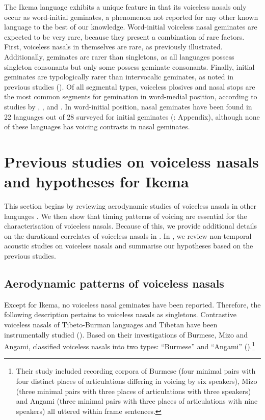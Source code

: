 \documentclass[output=paper]{langscibook}
\begin{document}
\begin{sloppypar}
The Ikema language exhibits a unique feature in that its voiceless nasals only occur as word-initial geminates, a phenomenon not reported for any other known language to the best of our knowledge. Word-initial voiceless nasal geminates are expected to be very rare, because they present a combination of rare factors. First, voiceless nasals in themselves are rare, as previously illustrated. Additionally, geminates are rarer than singletons, as all languages possess singleton consonants but only some possess geminate consonants. Finally, initial geminates are typologically rarer than intervocalic geminates, as noted in previous studies (\citealt{Thurgood1993,Dmitrieva2012}). Of all segmental types, voiceless plosives and nasal stops are the most common segments for gemination in word-medial position, according to studies by \citet{Jaeger1978}, \citet{Kirchner2001}, \citet{Podesva2002} and \citet{Maddieson2008}. In word-initial position, nasal geminates have been found in 22 languages out of 28 surveyed for initial geminates (\citealt{Muller2001}: Appendix), although none of these languages has voicing contrasts in nasal geminates.
\end{sloppypar}

\section{Previous studies on voiceless nasals and hypotheses for Ikema}
\label{sec:shinohara:2}
This section begins by reviewing aerodynamic studies of voiceless nasals in other languages . We then show that timing patterns of voicing are essential for the characterisation of voiceless nasals. Because of this, we provide additional details on the durational correlates of voiceless nasals in . In , we review non-temporal acoustic studies on voiceless nasals and summarise our hypotheses based on the previous studies.

\subsection{Aerodynamic patterns of voiceless nasals}\label{sec:shinohara:2.1}
Except for Ikema, no voiceless nasal geminates have been reported. Therefore, the following description pertains to voiceless nasals as singletons. Contrastive voiceless nasals of Tibeto-Burman languages and Tibetan have been instrumentally studied (\citealt{Dantsuji1984,Dantsuji1986,BhaskararaoLadefoged1991}). Based on their investigations of Burmese, Mizo and Angami, \citet{BhaskararaoLadefoged1991} classified voiceless nasals into two types: “Burmese” and “Angami” ().\footnote{ Their study included recording corpora of Burmese (four minimal pairs with four distinct places of articulations differing in voicing by six speakers), Mizo (three minimal pairs with three places of articulations with three speakers) and Angami (three minimal pairs with three places of articulations with nine speakers) all uttered within frame sentences.}
\end{document}
